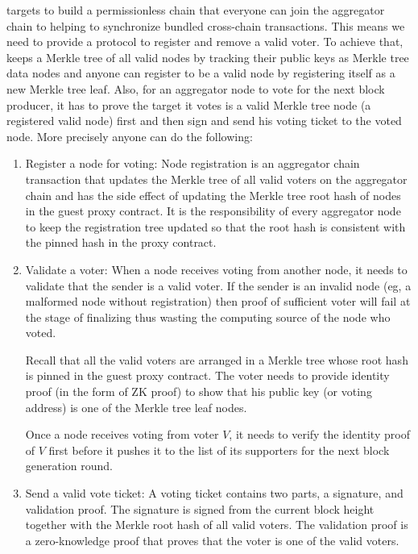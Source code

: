 \dprotocol targets to build a permissionless chain that everyone can join the aggregator chain to helping to synchronize bundled cross-chain transactions. This means we need to provide a protocol to register and remove a valid voter. To achieve that, \dprotocol keeps a Merkle tree of all valid nodes by tracking their public keys as Merkle tree data nodes and anyone can register to be a valid node by registering itself as a new Merkle tree leaf. Also, for an aggregator node to vote for the next block producer, it has to prove the target it votes is a valid Merkle tree node (a registered valid node) first and then sign and send his voting ticket to the voted node. More precisely anyone can do the following:
\begin{enumerate}[leftmargin=*]
\item Register a node for voting:
    Node registration is an aggregator chain transaction that updates the Merkle tree of all valid voters on the aggregator chain and has the side effect of updating the Merkle tree root hash of nodes in the guest proxy contract. It is the responsibility of every aggregator node to keep the registration tree updated so that the root hash is consistent with the pinned hash in the proxy contract. 

\item Validate a voter:
    When a node receives voting from another node, it needs to validate that the sender is a valid voter. If the sender is an invalid node (eg, a malformed node without registration) then proof of sufficient voter will fail at the stage of finalizing thus wasting the computing source of the node who voted.

    Recall that all the valid voters are arranged in a Merkle tree whose root hash is pinned in the guest proxy contract. The voter needs to provide identity proof (in the form of ZK proof) to show that his public key (or voting address) is one of the Merkle tree leaf nodes.
    
    Once a node receives voting from voter $V$, it needs to verify the identity proof of $V$ first before it pushes it to the list of its supporters for the next block generation round.

\item Send a valid vote ticket:
    A voting ticket contains two parts, a signature, and validation proof. The signature is signed from the current block height together with the Merkle root hash of all valid voters. The validation proof is a zero-knowledge proof that proves that the voter is one of the valid voters. 
\end{enumerate}

